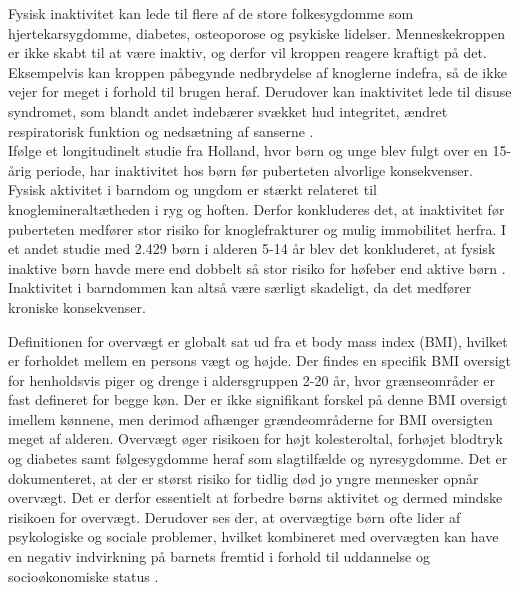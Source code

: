 
Fysisk inaktivitet kan lede til flere af de store folkesygdomme som hjertekarsygdomme, diabetes, osteoporose og psykiske lidelser. Menneskekroppen er ikke skabt til at være inaktiv, og derfor vil kroppen reagere kraftigt på det. Eksempelvis kan kroppen påbegynde nedbrydelse af knoglerne indefra, så de ikke vejer for meget i forhold til brugen heraf.%
\citep{Kiens2007,Reshma2002,Martini2012} Derudover kan inaktivitet lede til disuse syndromet, som blandt andet indebærer svækket hud integritet, ændret respiratorisk funktion og nedsætning af sanserne \citep{Knight2012,Mosby2009}.\\
Ifølge et longitudinelt studie fra Holland, hvor børn og unge blev fulgt over en 15-årig periode, har inaktivitet hos børn før puberteten alvorlige konsekvenser. Fysisk aktivitet i barndom og ungdom er stærkt relateret til knoglemineraltætheden i ryg og hoften. Derfor konkluderes det, at inaktivitet før puberteten medfører stor risiko for knoglefrakturer og mulig immobilitet herfra. \citep{Kemper2000} I et andet studie med 2.429 børn i alderen 5-14 år blev det konkluderet, at fysisk inaktive børn havde mere end dobbelt så stor risiko for høfeber end aktive børn \citep{Kohlhammer2006}. Inaktivitet i barndommen kan altså være særligt skadeligt, da det medfører kroniske konsekvenser.

Definitionen for overvægt er globalt sat ud fra et body mass index (BMI), hvilket er forholdet mellem en persons vægt og højde\citep{Academic2016}. Der findes en specifik BMI oversigt for henholdsvis piger og drenge i aldersgruppen 2-20 år, hvor grænseområder er fast defineret for begge køn. Der er ikke signifikant forskel på denne BMI oversigt imellem kønnene, men derimod afhænger grændeområderne for BMI oversigten meget af alderen.\newline
Overvægt øger risikoen for højt kolesteroltal, forhøjet blodtryk og diabetes samt følgesygdomme heraf som slagtilfælde og nyresygdomme. Det er dokumenteret, at der er størst risiko for tidlig død jo yngre mennesker opnår overvægt. Det er derfor essentielt at forbedre børns aktivitet og dermed mindske risikoen for overvægt. \citep{Nestle2014} Derudover ses der, at overvægtige børn ofte lider af psykologiske og sociale problemer, hvilket kombineret med overvægten kan have en negativ indvirkning på barnets fremtid i forhold til uddannelse og socioøkonomiske status \citep{Academic2016}.

